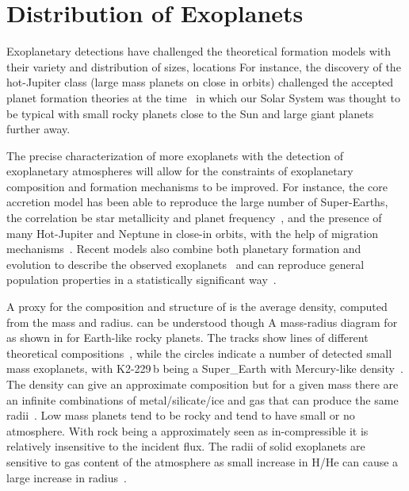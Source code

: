 
\section{Distribution of Exoplanets}

Exoplanetary detections have challenged the theoretical formation models with their variety and distribution of sizes, locations For instance, the discovery of the hot-Jupiter class (large mass planets on close in orbits) challenged the accepted planet formation theories at the time~\citep[.e.g][]{pollack_formation_1996, boss_giant_1997} in which our Solar System was thought to be typical with small rocky planets close to the Sun and large giant planets further away.


The precise characterization of more exoplanets with the detection of exoplanetary atmospheres will allow for the constraints of exoplanetary composition and formation mechanisms to be improved. For instance, the core accretion model has been able to reproduce the large number of Super-Earths, the correlation be star metallicity and planet frequency~\citep[e.g.][]{santos_spectroscopic_2004, fischer_planetmetallicity_2005}, and the presence of many Hot-Jupiter and Neptune in close-in orbits, with the help of migration mechanisms~\citep[e.g.][]{Triaud_exoplanets_2016}. Recent models also combine both planetary formation and evolution to describe the observed exoplanets~\citep[e.g.][]{mordasini_characterization_2012} and can reproduce general population properties in a statistically significant way~\citep{mordasini_characterization_2009}.

A proxy for the composition and structure of is the average density, computed from the mass and radius.   can be understood though A mass-radius diagram for as shown in  for Earth-like rocky planets. The tracks show lines of different theoretical compositions~\citep{brugger_constraints_2017}, while the circles indicate a number of detected small mass exoplanets, with K2-229\,b  being a Super_Earth with  Mercury-like density~\cite{santerne_earthsized_2018}.
The density can give an approximate composition but for a given mass there are an infinite combinations of metal/silicate/ice and gas that  can produce the same  radii~\citep[e.g.][]{seager_massradius_2007}.
Low mass planets tend to be rocky and tend to have small or no atmosphere. With rock being a approximately seen as in-compressible it is relatively insensitive to the incident flux. 
The radii of solid exoplanets are sensitive to gas content of the atmosphere as small increase in H/He can cause a large increase in radius~\citep{adams_ocean_2008}.


